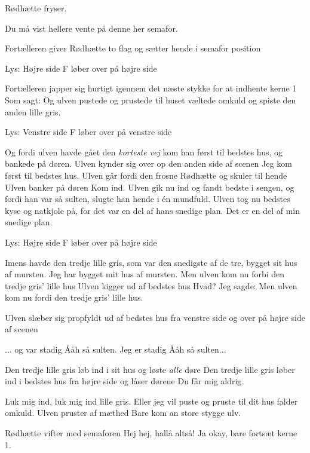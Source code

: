 \documentclass[a4paper,11pt]{article}
\begin{document}
\begin{sketch}
\scene Rødhætte fryser.

 Du må vist hellere vente på denne her semafor.

\scene Fortælleren giver Rødhætte to flag og sætter hende i semafor position

\scene Lys: Højre side
\scene F løber over på højre side

\scene Fortælleren japper sig hurtigt igennem det næste stykke for at indhente kerne 1
 Som sagt: Og ulven pustede og prustede til huset væltede omkuld og spiste den anden lille gris.

\scene Lys: Venstre side
\scene F løber over på venstre side

 Og fordi ulven havde gået den \emph{korteste vej} kom han først til bedstes hus, og bankede på døren.
\scene Ulven kynder sig over op den anden side af scenen
 Jeg kom først til bedstes hus.
\scene Ulven går fordi den frosne Rødhætte og skuler til hende
\scene Ulven banker på døren
 Kom ind.
 Ulven gik nu ind og fandt bedste i sengen, og fordi han var så sulten, slugte han hende i én mundfuld.
 Ulven tog nu bedstes kyse og natkjole på, for det var en del af hans snedige plan.
 Det er en del af min snedige plan.

\scene Lys: Højre side
\scene F løber over på højre side

 Imens havde den tredje lille gris, som var den snedigste af de tre, bygget sit hus af mursten.
 Jeg har bygget mit hus af mursten.
 Men ulven kom nu forbi den tredje gris' lille hus
\scene Ulven kigger ud af bedstes hus
 Hvad?
 Jeg sagde: Men ulven kom nu fordi den tredje gris' lille hus.

\scene Ulven slæber sig propfyldt ud af bedstes hus fra venstre side og over på højre side af scenen

 ... og var stadig Ååh så sulten.
 Jeg er stadig Ååh så sulten...

 Den tredje lille gris løb ind i sit hus og løste \emph{alle} døre
\scene Den tredje lille gris løber ind i bedstes hus fra højre side og låser dørene
 Du får mig aldrig.

 Luk mig ind, luk mig ind lille gris. Eller jeg vil  puste og pruste til dit hus falder omkuld.
\scene Ulven pruster af mæthed
 Bare kom an store stygge ulv.

\scene Rødhætte vifter med semaforen
 Hej hej, hallå altså!
 Ja okay, bare fortsæt kerne 1.


\end{sketch}
\end{document}
